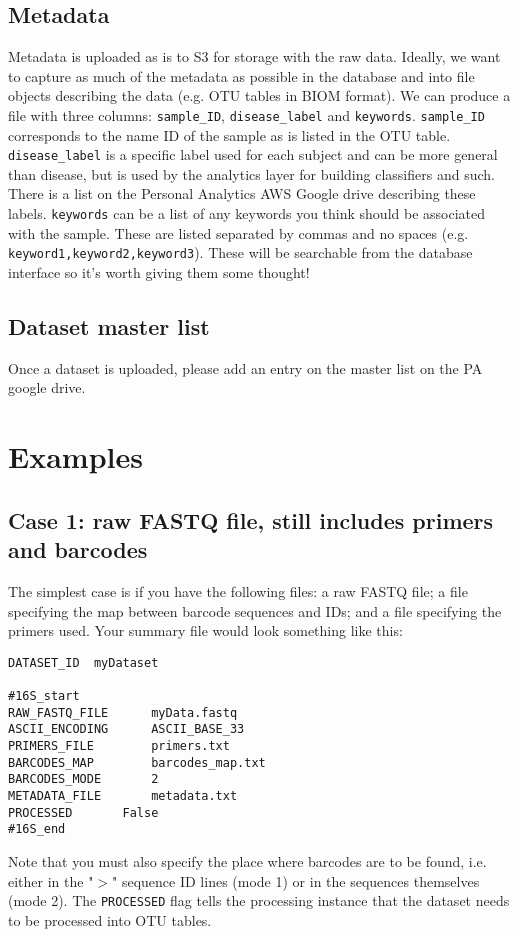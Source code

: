 \documentclass[11pt, oneside]{article}   	%
\begin{document}
\subsection{Metadata}
Metadata is uploaded as is to S3 for storage with the raw data.  Ideally, we want to capture as much of the metadata as possible in the database and into file objects describing the data (e.g. OTU tables in BIOM format).  We can produce a file with three columns: {\tt sample\_ID}, {\tt disease\_label} and {\tt keywords}.  {\tt sample\_ID} corresponds to the name ID of the sample as is listed in the OTU table.  {\tt disease\_label} is a specific label used for each subject and can be more general than disease, but is used by the analytics layer for building classifiers and such.  There is a list on the Personal Analytics AWS Google drive describing these labels.  {\tt keywords} can be a list of any keywords you think should be associated with the sample.  These are listed separated by commas and no spaces (e.g. {\tt keyword1,keyword2,keyword3}).  These will be searchable from the database interface so it's worth giving them some thought!

\subsection{Dataset master list}
Once a dataset is uploaded, please add an entry on the master list on the PA google drive.

\section{Examples}
\subsection{Case 1: raw FASTQ file, still includes primers and barcodes}
The simplest case is if you have the following files: a raw FASTQ file; a file specifying the map between barcode sequences and IDs; and a file specifying the primers used.  Your summary file would look something like this:

\begin{verbatim}
DATASET_ID	myDataset

#16S_start
RAW_FASTQ_FILE		myData.fastq
ASCII_ENCODING		ASCII_BASE_33
PRIMERS_FILE		primers.txt
BARCODES_MAP		barcodes_map.txt
BARCODES_MODE		2
METADATA_FILE		metadata.txt
PROCESSED		False
#16S_end
\end{verbatim}
Note that you must also specify the place where barcodes are to be found, i.e. either in the "$>$" sequence ID lines (mode 1) or in the sequences themselves (mode 2).  The {\tt PROCESSED} flag tells the processing instance that the dataset needs to be processed into OTU tables.
\end{document}
